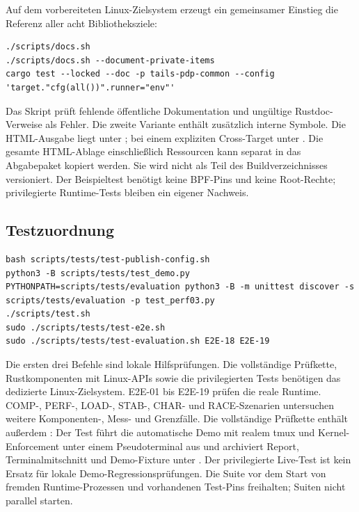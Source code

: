 \documentclass[12pt,a4paper]{article}
\begin{document}
Auf dem vorbereiteten Linux-Zielsystem erzeugt ein gemeinsamer Einstieg die
Referenz aller acht Bibliotheksziele:
\begin{lstlisting}
./scripts/docs.sh
./scripts/docs.sh --document-private-items
cargo test --locked --doc -p tails-pdp-common --config 'target."cfg(all())".runner="env"'
\end{lstlisting}
Das Skript prüft fehlende öffentliche Dokumentation und ungültige Rustdoc-Verweise
als Fehler. Die zweite Variante enthält zusätzlich interne Symbole. Die
HTML-Ausgabe liegt unter ; bei einem expliziten Cross-Target unter
. Die gesamte HTML-Ablage einschließlich Ressourcen
kann separat in das Abgabepaket kopiert werden. Sie wird nicht als Teil des
Buildverzeichnisses versioniert. Der Beispieltest benötigt keine BPF-Pins und
keine Root-Rechte; privilegierte Runtime-Tests bleiben ein eigener Nachweis.

\subsection{Testzuordnung}
\begin{lstlisting}
bash scripts/tests/test-publish-config.sh
python3 -B scripts/tests/test_demo.py
PYTHONPATH=scripts/tests/evaluation python3 -B -m unittest discover -s scripts/tests/evaluation -p test_perf03.py
./scripts/test.sh
sudo ./scripts/tests/test-e2e.sh
sudo ./scripts/tests/test-evaluation.sh E2E-18 E2E-19
\end{lstlisting}
Die ersten drei Befehle sind lokale Hilfsprüfungen. Die vollständige Prüfkette,
Rustkomponenten mit Linux-APIs sowie die privilegierten Tests benötigen das
dedizierte Linux-Zielsystem. E2E-01 bis E2E-19 prüfen die reale Runtime.
COMP-, PERF-, LOAD-, STAB-, CHAR- und RACE-Szenarien untersuchen weitere
Komponenten-, Mess- und Grenzfälle. Die vollständige Prüfkette enthält außerdem
: Der Test führt die automatische Demo mit
realem tmux und Kernel-Enforcement unter einem Pseudoterminal aus und archiviert
Report, Terminalmitschnitt und Demo-Fixture unter .
Der privilegierte Live-Test ist kein Ersatz für lokale Demo-Regressionsprüfungen.
Die Suite vor dem Start von fremden
Runtime-Prozessen und vorhandenen Test-Pins freihalten; Suiten nicht parallel starten.
\end{document}
